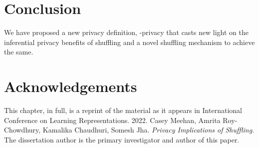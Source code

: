 \section{Conclusion}
We have proposed a new privacy definition, \name-privacy that casts new light on the inferential privacy benefits of shuffling and a novel shuffling mechanism to achieve the same. %

\section{Acknowledgements} 
This chapter, in full, is a reprint of the material as it appears in International Conference on Learning Representations. 2022. Casey Meehan, Amrita Roy-Chowdhury, Kamalika Chaudhuri, Somesh Jha. \emph{Privacy Implications of Shuffling}. The dissertation author is the primary investigator and author of this paper.


